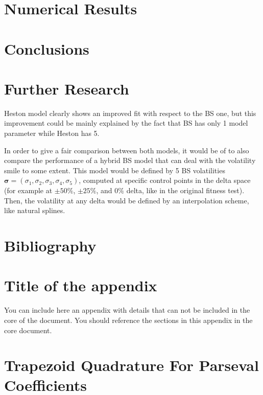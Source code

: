 \documentclass[12,twoside]{mammeTFM}
\theoremstyle{definition}
\theoremstyle{remark}
\begin{document}
\section{Numerical Results}

\section{Conclusions}

\section{Further Research}
Heston model clearly shows an improved fit with respect to the BS one, but this improvement could be mainly explained by the fact that BS has only 1 model parameter while Heston has 5.

In order to give a fair comparison between both models, it would be of to also compare the performance of a hybrid BS model that can deal with the volatility smile to some extent. This model would be defined by 5 BS volatilities $\boldsymbol{\sigma} = (\sigma_1, \sigma_2, \sigma_3, \sigma_4, \sigma_5)$, computed at specific control points in the delta space (for example at $\pm50\%$, $\pm25\%$, and $0\%$ delta, like in the original fitness test). Then, the volatility at any delta would be defined by an interpolation scheme, like natural splines.

\section{Bibliography}


{}


\appendix
\vfill\newpage \section{Title of the appendix}
You can include here an appendix with details that can not be included in the core of the document. You should reference the sections in this appendix in the core document.

\section{Trapezoid Quadrature For Parseval Coefficients}
\end{document}
